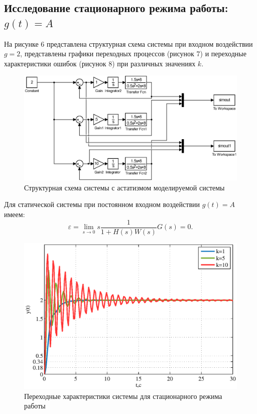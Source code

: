 \documentclass[a4paper,12pt]{article} %
\begin{document}
\subsection{Исследование стационарного режима работы: $g(t)=A$} 
На рисунке 6 представлена структурная схема системы при входном воздействии \\$g=2$, представлены графики переходных процессов (рисунок 7) и переходные характеристики ошибок (рисунок 8) при различных значениях $k$. 
\begin{figure}[H]
	\centering
	\includegraphics[width=1\linewidth]{scheme/scheme3.eps}
	\caption{Структурная схема системы с астатизмом моделируемой системы}
\end{figure}
Для статической системы при постоянном входном воздействии $g(t)=A$ имеем:
\begin{equation}
    \varepsilon = \lim_{s\to0} s\frac{1}{1+H(s)W(s)}G(s) = 0.
\end{equation}
\begin{figure}[H]
	\centering
	\includegraphics[width=1\linewidth]{scheme/plot5.eps}
	\caption{Переходные характеристики системы для стационарного режима работы}
\end{figure}
\end{document}

